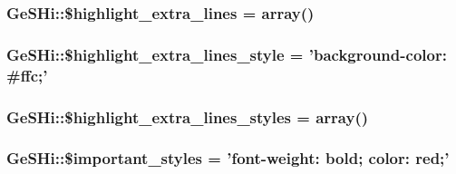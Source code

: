 \hypertarget{class_ge_s_hi_aaaa37ec87cc8ed80636d3a8e035fecae}{
\subsubsection[{\$highlight\-\_\-extra\-\_\-lines}]{\setlength{\rightskip}{0pt plus 5cm}Ge\-S\-Hi\-::\$highlight\-\_\-extra\-\_\-lines = array()}}\label{class_ge_s_hi_aaaa37ec87cc8ed80636d3a8e035fecae}
\hypertarget{class_ge_s_hi_a94a7fe9bec0d689840e751abc6f738de}{
\subsubsection[{\$highlight\-\_\-extra\-\_\-lines\-\_\-style}]{\setlength{\rightskip}{0pt plus 5cm}Ge\-S\-Hi\-::\$highlight\-\_\-extra\-\_\-lines\-\_\-style = 'background-\/color\-: \#ffc;'}}\label{class_ge_s_hi_a94a7fe9bec0d689840e751abc6f738de}
\hypertarget{class_ge_s_hi_affb373ad2d2448a84903566e4d189c4e}{
\subsubsection[{\$highlight\-\_\-extra\-\_\-lines\-\_\-styles}]{\setlength{\rightskip}{0pt plus 5cm}Ge\-S\-Hi\-::\$highlight\-\_\-extra\-\_\-lines\-\_\-styles = array()}}\label{class_ge_s_hi_affb373ad2d2448a84903566e4d189c4e}
\hypertarget{class_ge_s_hi_ad60ec93162108b80bf6cdd9decd74e4c}{
\subsubsection[{\$important\-\_\-styles}]{\setlength{\rightskip}{0pt plus 5cm}Ge\-S\-Hi\-::\$important\-\_\-styles = 'font-\/weight\-: bold; color\-: red;'}}\label{class_ge_s_hi_ad60ec93162108b80bf6cdd9decd74e4c}
